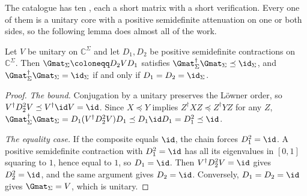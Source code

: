 
The catalogue has ten , each a short matrix with
a short verification. Every one of them is a unitary core with a positive
semidefinite attenuation on one or both sides, so the following lemma does
almost all of the work.

\begin{lemma}\label{lem:attenuated}
Let $V$ be unitary on $\mathbb{C}^\Sigma$ and let $D_1,D_2$ be positive
semidefinite contractions on $\mathbb{C}^\Sigma$. Then
$\Gmat_\Sigma\coloneqq D_2VD_1$ satisfies
$\Gmat_\Sigma^\dagger\Gmat_\Sigma\preceq\id_\Sigma$, and
$\Gmat_\Sigma^\dagger\Gmat_\Sigma=\id_\Sigma$ if and only if
$D_1=D_2=\id_\Sigma$.
\end{lemma}

\begin{proof}
\emph{The bound.} Conjugation by a unitary preserves the Löwner order, so
$V^\dagger D_2^2V\preceq V^\dagger\id V=\id$. Since $X\preceq Y$ implies
$Z^\dagger XZ\preceq Z^\dagger YZ$ for any $Z$,
$\Gmat_\Sigma^\dagger\Gmat_\Sigma=D_1(V^\dagger D_2^2V)D_1\preceq D_1\id
D_1=D_1^2\preceq\id$.

\emph{The equality case.} If the composite equals $\id$, the chain forces
$D_1^2=\id$. A positive semidefinite contraction with $D_1^2=\id$ has all its
eigenvalues in $[0,1]$ squaring to $1$, hence equal to $1$, so $D_1=\id$. Then
$V^\dagger D_2^2V=\id$ gives $D_2^2=\id$, and the same argument gives
$D_2=\id$. Conversely, $D_1=D_2=\id$ gives $\Gmat_\Sigma=V$, which is
unitary.
\end{proof}
